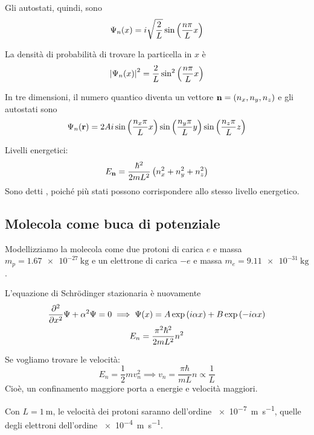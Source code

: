 Gli autostati, quindi, sono
\begin{equation}
\label{eq:autostati_scatola}
    \Psi_n(x) = i \sqrt{\frac{2}{L}} \sin\left( \frac{n \pi}{L} x \right)
\end{equation}

La densità di probabilità di trovare la particella in $x$ è
\begin{equation}
    \left\lvert \Psi_n(x) \right\rvert^2 = \frac{2}{L} \sin^2\left( \frac{n \pi}{L} x \right)
\end{equation}

In tre dimensioni, il numero quantico diventa un vettore $\mathbf{n} = (n_x, n_y, n_z)$ e gli autostati sono
\begin{equation}
    \Psi_n(\mathbf{r}) = 2 A i \sin\left( \frac{n_x \pi}{L} x \right) \sin\left( \frac{n_y \pi}{L} y \right) \sin\left( \frac{n_z \pi}{L} z \right)
\end{equation}

Livelli energetici:
\begin{equation}
    E_{\mathbf{n}} = \frac{\hbar^2}{2 m L^2} \left( n_x^2 + n_y^2 + n_z^2 \right)
\end{equation}
Sono detti , poiché più stati possono corrispondere allo stesso livello energetico.


\subsection{Molecola come buca di potenziale}

Modellizziamo la molecola  come due protoni di carica $e$ e massa $m_p = \qty{1.67e-27}{\kilo\gram}$ e un elettrone di carica $-e$ e massa $m_e = \qty{9.11e-31}{\kilo\gram}$.

L'equazione di Schrödinger stazionaria è nuovamente
\begin{gather}
    \parder[][2]{x} \Psi + \alpha^2 \Psi = 0
    \implies
    \Psi(x) = A \exp{\im \alpha x} + B \exp{-\im \alpha x} \\
    E_n = \frac{\pi^2 \hbar^2}{2 m L^2} n^2
\end{gather}

Se vogliamo trovare le velocità:
\begin{equation}
    E_n = \frac{1}{2} m v_n^2 \implies v_n
    = \frac{\pi \hbar}{m L} n \propto \frac{1}{L}
\end{equation}
Cioè, un confinamento maggiore porta a energie e velocità maggiori.

Con $L = \qty{1}{\meter}$, le velocità dei protoni saranno dell'ordine \qty{e-7}{\metre\per\second}, quelle degli elettroni dell'ordine \qty{e-4}{\metre\per\second}.

